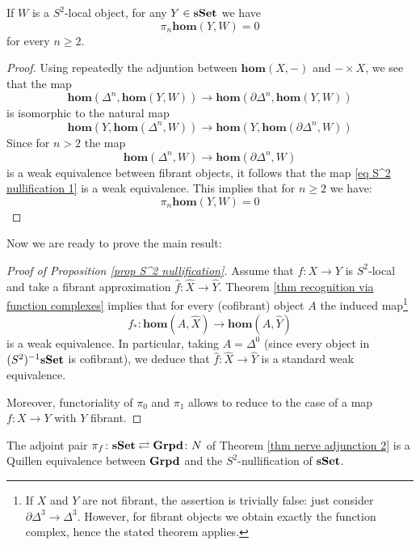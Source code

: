 \begin{refsection}
\begin{cor} \label{cor S^2 nullification}
If $W$ is a $S^2$-local object, for any $Y \in \mathbf{s\,\!\mathbf{Set}}$ we have
\[
\pi_n \mathbf{hom}(Y,W) = 0
\]
for every $n \ge 2$.
\end{cor}

\begin{proof}
Using repeatedly the adjuntion between $\mathbf{hom}(X,-)$ and $- \times X$, we see that the map
\begin{equation} \label{eq S^2 nullification 1}
\mathbf{hom}(\Delta^n, \mathbf{hom}(Y,W)) \to \mathbf{hom}(\partial \Delta^n, \mathbf{hom}(Y,W))
\end{equation}
is isomorphic to the natural map
\[
\mathbf{hom}(Y, \mathbf{hom}(\Delta^n,W)) \to \mathbf{hom}(Y, \mathbf{hom}(\partial \Delta^n,W))
\]
Since for $n > 2$ the map
\[
\mathbf{hom}(\Delta^n,W) \to \mathbf{hom}(\partial \Delta^n,W)
\]
is a weak equivalence between fibrant objects, it follows that the map \eqref{eq S^2 nullification 1} is a weak equivalence. This implies that for $n \ge 2$ we have:
\[
\pi_n \mathbf{hom}(Y,W) = 0
\]
\end{proof}

Now we are ready to prove the main result:

\begin{proof}[Proof of Proposition \ref{prop S^2 nullification}]
Assume that $f \colon X \to Y$ is $S^2$-local and take a fibrant approximation $\widehat{f} \colon \widehat{X} \to \widehat{Y}$. Theorem \ref{thm recognition via function complexes} implies that for every (cofibrant) object $A$ the induced map\footnote{If $X$ and $Y$ are not fibrant, the assertion is trivially false: just consider $\partial \Delta^3 \to \Delta^3$. However, for fibrant objects we obtain exactly the function complex, hence the stated theorem applies.}
\[
f_* \colon \mathbf{hom}(A,\widehat{X}) \to \mathbf{hom}(A,\widehat{Y})
\]
is a weak equivalence. In particular, taking $A = \Delta^0$ (since every object in $(S^2)^{-1} \mathbf{s\,\!\mathbf{Set}}$ is cofibrant), we deduce that $\widehat{f} \colon \widehat{X} \to \widehat{Y}$ is a standard weak equivalence.

Moreover, functoriality of $\pi_0$ and $\pi_1$ allows to reduce to the case of a map $f \colon X \to Y$ with $Y$ fibrant.
\end{proof}

\begin{thm} \label{thm groupoids nullification}
The adjoint pair $\pi_f \colon \mathbf{s\,\!\mathbf{Set}} \rightleftarrows \mathbf{Grpd} \colon N$ of Theorem \ref{thm nerve adjunction 2} is a Quillen equivalence between $\mathbf{Grpd}$ and the $S^2$-nullification of $\mathbf{s\,\!\mathbf{Set}}$.
\end{thm}


\end{refsection}
